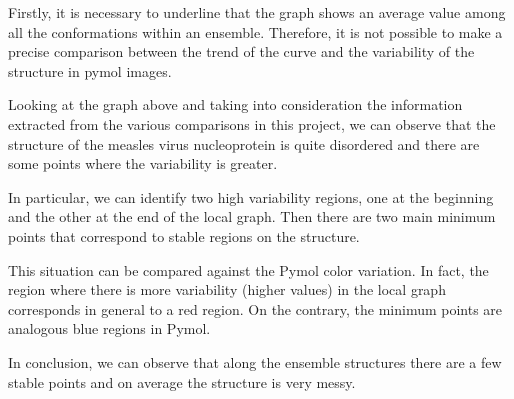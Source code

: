 \medskip
Firstly, it is necessary to underline that the graph shows an average value among all the conformations within an ensemble. Therefore, it is not possible to make a precise comparison between the trend of the curve and the variability of the structure in pymol images. 

\medskip
Looking at the graph above and taking into consideration the information extracted from the various comparisons in this project, we can observe that the structure of the measles virus nucleoprotein is quite disordered and there are some points where the variability is greater. 

In particular, we can identify two high variability regions, one at the beginning and the other at the end of the local graph. Then there are two main minimum points that correspond to stable regions on the structure. 

This situation can be compared against the Pymol color variation. In fact, the region where there is more variability (higher values) in the local graph corresponds in general to a red region. On the contrary, the minimum points are analogous blue regions in Pymol.

In conclusion, we can observe that along the ensemble structures there are a few stable points and on average the structure is very messy.

